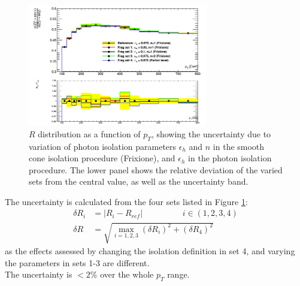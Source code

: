 \documentclass[11pt,a4paper,openright,twoside]{report}
\begin{document}
\begin{figure}[H]
\centering
	\includegraphics[width=0.7\textwidth]{frag.png}
	\caption{$R$ distribution as a function of $p_T$, showing the uncertainty due to variation of photon isolation parameters $\epsilon_h$ and $n$ in the smooth cone isolation procedure (Frixione), and $\epsilon_h$ in the photon isolation procedure. The lower panel shows the relative deviation of the varied sets from the central value, as well as the uncertainty band.}
	\label{fig:photon_frag}
\end{figure}

The uncertainty is calculated from the four sets listed in Figure \ref{fig:photon_frag}:
\begin{equation}
\begin{split}
\delta R_i &= |R_i - R_{ref}| \hspace{2cm}  i \in (1,2,3,4)\\
\delta R &= \sqrt{\max_{i=1,2,3}(\delta R_i)^2 + (\delta R_4)^2}
\end{split}
\end{equation}
as the effects assessed by changing the isolation definition in set 4, and varying the parameters in sets 1-3 are different.\\
The uncertainty is $< 2\%$ over the whole $p_T$ range.
\end{document}
